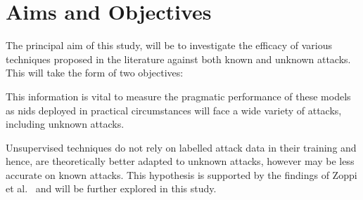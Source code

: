 \chapter{Aims and Objectives}%
\label{chp:aims}
\hypertarget{obj}{}

The principal aim of this study, will be to investigate the efficacy of various
techniques proposed in the literature against both known and unknown attacks.
This will take the form of two objectives:

\begin{center}
\end{center}

This information is vital to measure the pragmatic performance of these models
as \gls{nids} deployed in practical circumstances will face a wide variety of
attacks, including unknown attacks.

\begin{center}
\end{center}

Unsupervised techniques do not rely on labelled attack data in their training
and hence, are theoretically better adapted to unknown attacks, however may be
less accurate on known attacks. This hypothesis is supported by the findings of
Zoppi et al.~\cite{Zoppi} and will be further explored in this study.

